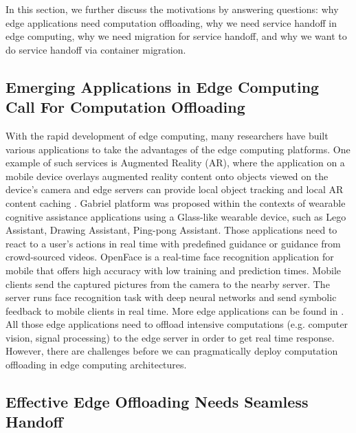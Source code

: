In this section, we further discuss the motivations by answering
questions: why edge applications need computation offloading, why we need  
service handoff in edge computing, why we need migration for service handoff, and why we want to do service handoff via container migration.

\subsection{Emerging Applications in Edge Computing Call For Computation Offloading}

With the rapid development of edge computing, many researchers have built various applications to take the advantages of the edge computing platforms. 
One example of such services is Augmented Reality (AR), where the application on a mobile device overlays augmented reality content
onto objects viewed on the device's camera and edge servers can
provide local object tracking and local AR content caching
\cite{satya2009case,MEC2014initiative,MEC2015-5G,hao2017challenges}.
%
Gabriel platform \cite{ha2014wearable}  was proposed within the contexts of wearable cognitive assistance applications using a Glass-like wearable device, such as Lego Assistant, Drawing Assistant, Ping-pong Assistant.%
Those applications need to react to a user's actions in real time with predefined guidance or guidance from crowd-sourced videos. 
%
%
OpenFace\cite{openface2016} is a real-time face recognition application for mobile that offers high accuracy with low training and prediction times. Mobile clients send the captured pictures from the camera to the nearby server. The server runs face recognition task with deep neural networks and send symbolic feedback to mobile clients in real time.  
More edge applications can be found in \cite{yi2015fog,yi2015survey,satya2017edge}.
%
All those edge applications need to offload intensive computations (e.g. computer vision, signal processing) to the edge server in order to get real time response. However, there are challenges before we can pragmatically deploy computation offloading in edge computing architectures. 

\subsection{Effective Edge Offloading Needs Seamless Handoff}

